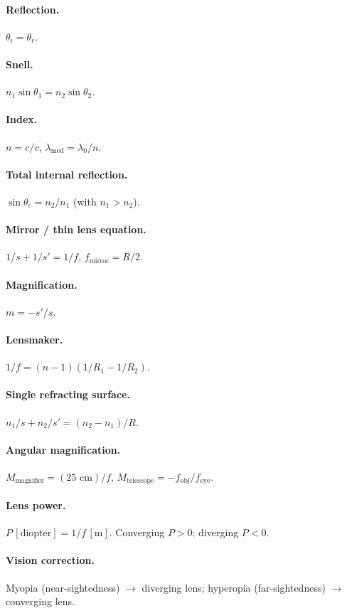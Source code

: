 \documentclass[11pt]{article}
\begin{document}
\paragraph{Reflection.} $\theta_i = \theta_r$.
\paragraph{Snell.} $n_1\sin\theta_1 = n_2\sin\theta_2$.
\paragraph{Index.} $n = c/v$, $\lambda_{\text{med}} = \lambda_0/n$.
\paragraph{Total internal reflection.} $\sin\theta_c = n_2/n_1$ (with $n_1 > n_2$).
\paragraph{Mirror / thin lens equation.}
$1/s + 1/s' = 1/f$, $f_{\text{mirror}} = R/2$.
\paragraph{Magnification.} $m = -s'/s$.
\paragraph{Lensmaker.} $1/f = (n - 1)(1/R_1 - 1/R_2)$.
\paragraph{Single refracting surface.} $n_1/s + n_2/s' = (n_2 - n_1)/R$.
\paragraph{Angular magnification.}
$M_{\text{magnifier}} = (25\text{ cm})/f$, $M_{\text{telescope}} = -f_{\text{obj}}/f_{\text{eye}}$.
\paragraph{Lens power.} $P\,[\text{diopter}] = 1/f\,[\text{m}]$. Converging $P>0$; diverging $P<0$.
\paragraph{Vision correction.} Myopia (near-sightedness) $\to$ diverging lens; hyperopia (far-sightedness) $\to$ converging lens.
\end{document}
